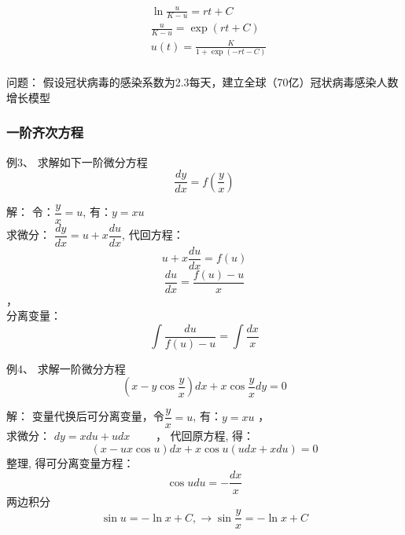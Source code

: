 \begin{frame}
	\begin{align*}
		&\ln \frac{u}{K-u}  = r t+C\\
		&\frac{u}{K-u} = \exp (r t+C)\\
		&u(t) = \frac{K}{1+ \exp (-r t-C)}	\\
	\end{align*}	
	\begin{block} {问题：}
	假设冠状病毒的感染系数为2.3每天，建立全球（70亿）冠状病毒感染人数增长模型
	\end{block}    
\end{frame}

\begin{frame}
	\frametitle{一阶齐次方程 }
	\begin{exampleblock} {例3、	求解如下一阶微分方程}
	\begin{equation*}
		\frac{d y}{d x}=f\left(\frac{y}{x}\right) 
	\end{equation*}
	\end{exampleblock} 	
	\alert{解：} 令：$\dfrac{y}{x}=u$, 有：$y=xu$ \\ 
	求微分： $ \dfrac{d y}{d x}=u+x \dfrac{d u}{d x}$,	代回方程：\\	
	 \[ u+x \dfrac{d u}{d x}=f(u)\]  \[ \dfrac{d u}{d x}=\dfrac{f(u)-u}{x}\] ，\\ \vspace{0.2cm}
	分离变量：
	\[\int \dfrac{d u}{f(u)-u}=\int \dfrac{d x}{x}\] 		
\end{frame}

\begin{frame}
\begin{exampleblock} {例4、	求解一阶微分方程}
	\begin{equation*}
	\left(x-y \cos \frac{y}{x}\right) d x+x \cos \frac{y}{x} d y=0
	\end{equation*}
\end{exampleblock} 	
\alert{解：} 变量代换后可分离变量，令$\dfrac{y}{x}=u$, 有：$y=xu$ ， \\ 
		求微分：	$d y=x d u+u d x$ ~~~~， 
		代回原方程, 得：
		\begin{equation*}
			(x-u x \cos u) d x+x \cos u(u d x+x d u)=0
		\end{equation*}	
		整理, 得可分离变量方程：
		\begin{equation*}
			\cos udu=-\frac{dx}{x}
		\end{equation*}	
		两边积分
		\begin{equation*}
			\sin u=-\ln x+C, \to  \sin \frac{y}{x}=-\ln x+C
		\end{equation*}	
\end{frame}


